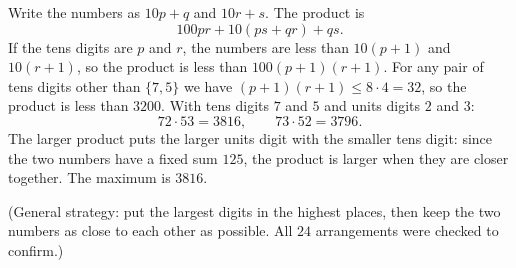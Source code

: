 Write the numbers as $10p+q$ and $10r+s$. The product is
\[
100pr+10(ps+qr)+qs .
\]
If the tens digits are $p$ and $r$, the numbers are less than $10(p+1)$ and $10(r+1)$, so the product is less than $100(p+1)(r+1)$. For any pair of tens digits other than $\{7,5\}$ we have $(p+1)(r+1)\le8\cdot4=32$, so the product is less than $3200$. With tens digits $7$ and $5$ and units digits $2$ and $3$:
\[
72\cdot53=3816,\qquad 73\cdot52=3796 .
\]
The larger product puts the larger units digit with the smaller tens digit: since the two numbers have a fixed sum $125$, the product is larger when they are closer together. The maximum is $\boxed{3816}$.

(General strategy: put the largest digits in the highest places, then keep the two numbers as close to each other as possible. All $24$ arrangements were checked to confirm.)
